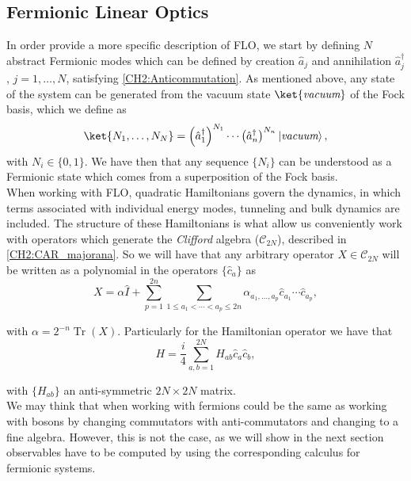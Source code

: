 \subsection{Fermionic Linear Optics}
In order provide a more specific description of FLO, we start by defining $N$ abstract Fermionic modes which can be defined by creation $\hat{a}_j$ and annihilation $\hat{a}_j^{\dagger}$, $j=1,\ldots,N$, satisfying \eqref{CH2:Anticommutation}. As mentioned above, any state of the system can be generated from the vacuum state $\ket{\textit{vacuum}}$ of the Fock basis, which we define as
\begin{equation}
\ket{N_1,\ldots,N_{N}} = \left(\hat{a}_{1}^{\dagger}\right)^{N_{1}} \cdots\left(\hat{a}_{n}^{\dagger}\right)^{N_{n}}\left|\textit{vacuum}\right\rangle,
\label{CH2:Fock_Space}
\end{equation}
with $N_i\in \{0,1\}$. We have then that any sequence $\{N_i\}$ can be understood as a Fermionic state which comes from a superposition of the Fock basis.\\
When working with FLO, quadratic Hamiltonians govern the dynamics, in which terms associated with individual energy modes, tunneling and bulk dynamics are included. The structure of these Hamiltonians is what allow us conveniently work with operators which generate the \textit{Clifford} algebra ($\mathcal{C}_{2N}$), described in \eqref{CH2:CAR_majorana}. So we will have that any arbitrary operator $X\in \mathcal{C}_{2N}$ will be written as a polynomial in the operators $\{\hat{c}_a\}$ as
\begin{equation}
X=\alpha \hat{I}+\sum_{p=1}^{2 n} \sum_{1 \leq a_{1}<\cdots<a_{p} \leq 2 n} \alpha_{a_{1}, \ldots, a_{p}} \hat{c}_{a_{1}} \cdots \hat{c}_{a_{p}},
\label{CH2:operators_in_clifford}
\end{equation}

with $\alpha=2^{-n} \operatorname{Tr}(X)$. Particularly for the Hamiltonian operator we have that
\begin{equation}
H=\frac{i}{4} \sum_{a, b=1}^{2 N} H_{a b} \hat{c}_{a} \hat{c}_{b},
\label{CH2:Hamiltonian_in_CLifford}
\end{equation}

with $\{H_{a b}\}$ an anti-symmetric $2N\times 2N$ matrix.\\
We may think that when working with fermions could be the same as working with bosons by changing commutators with anti-commutators and changing to a fine algebra. However, this is not the case, as we will show in the next section observables have to be computed by using the corresponding calculus for fermionic systems.

